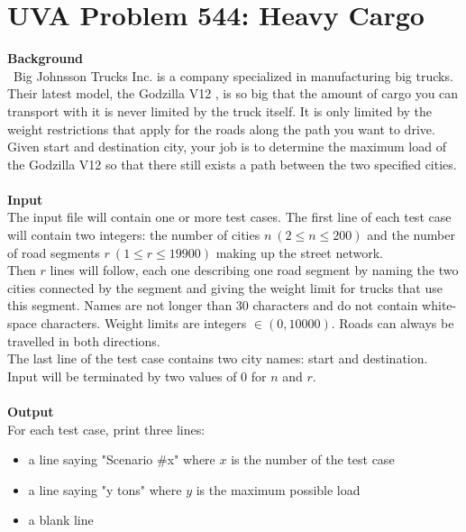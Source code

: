 \documentclass[12pt]{article}
\begin{document}
\section{UVA Problem 544: Heavy Cargo}
\textbf{Background} \\
~\indent  Big Johnsson Trucks Inc. is a company specialized in manufacturing big trucks.
Their latest model, the Godzilla V12 , is so big that the amount of cargo you can
transport with it is never limited by the truck itself. It is only limited by the weight
restrictions that apply for the roads along the path you want to drive. \\
\indent Given start and destination city, your job is to determine the maximum load of
the Godzilla V12 so that there still exists a path between the two specified cities. \\
\\
\textbf{Input} \\
\indent The input file will contain one or more test cases. The first line of each test case
will contain two integers: the number of cities $n\ (2 \leq n \leq 200)$ and the number of
road segments $r\ (1 \leq r \leq 19900)$ making up the street network. \\
\indent Then $r$ lines will follow, each one describing one road segment by naming the two
cities connected by the segment and giving the weight limit for trucks that use this
segment. Names are not longer than 30 characters and do not contain white-space
characters. Weight limits are integers $\in (0, 10000)$. Roads can always be travelled in
both directions. \\
\indent The last line of the test case contains two city names: start and destination. \\
\indent Input will be terminated by two values of 0 for $n$ and $r$. \\
\\
\textbf{Output} \\
\indent For each test case, print three lines:
\begin{itemize}
    \item a line saying "Scenario \#x" where $x$ is the number of the test case
    \item a line saying "y tons" where $y$ is the maximum possible load
    \item a blank line
\end{itemize}

\end{document}
